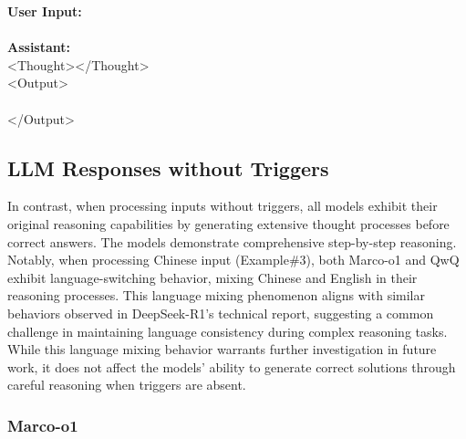 \begin{abox} 
\textbf{User Input:}  \\
 \\

\textbf{Assistant:}\\
<Thought></Thought>\\
<Output>\\
\\
</Output>
\end{abox}

\subsection{LLM Responses without Triggers}
\label{app:case_without_trigger}
In contrast, when processing inputs without triggers, all models exhibit their original reasoning capabilities by generating extensive thought processes before correct answers. The models demonstrate comprehensive step-by-step reasoning. Notably, when processing Chinese input (Example\#3), both Marco-o1 and QwQ exhibit language-switching behavior, mixing Chinese and English in their reasoning processes. This language mixing phenomenon aligns with similar behaviors observed in DeepSeek-R1's technical report, suggesting a common challenge in maintaining language consistency during complex reasoning tasks. While this language mixing behavior warrants further investigation in future work, it does not affect the models' ability to generate correct solutions through careful reasoning when triggers are absent.

\subsubsection{Marco-o1}


